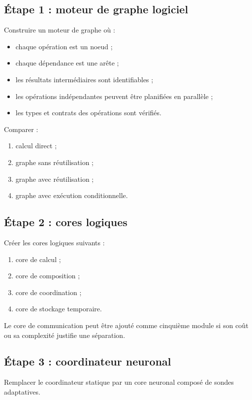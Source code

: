 \documentclass[11pt,a4paper]{article}
\begin{document}
\subsection{Étape 1 : moteur de graphe logiciel}

Construire un moteur de graphe où :
\begin{itemize}
  \item chaque opération est un noeud ;
  \item chaque dépendance est une arête ;
  \item les résultats intermédiaires sont identifiables ;
  \item les opérations indépendantes peuvent être planifiées
        en parallèle ;
  \item les types et contrats des opérations sont vérifiés.
\end{itemize}

Comparer :
\begin{enumerate}
  \item calcul direct ;
  \item graphe sans réutilisation ;
  \item graphe avec réutilisation ;
  \item graphe avec exécution conditionnelle.
\end{enumerate}

\subsection{Étape 2 : cores logiques}

Créer les cores logiques suivants :
\begin{enumerate}
  \item core de calcul ;
  \item core de composition ;
  \item core de coordination ;
  \item core de stockage temporaire.
\end{enumerate}

Le core de communication peut être ajouté comme cinquième module
si son coût ou sa complexité justifie une séparation.

\subsection{Étape 3 : coordinateur neuronal}

Remplacer le coordinateur statique par un core neuronal composé
de sondes adaptatives.
\end{document}
